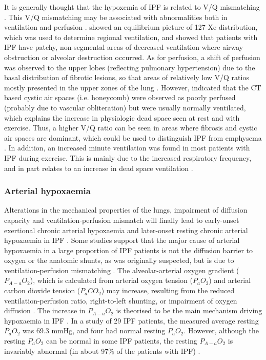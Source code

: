 It is generally thought that the hypoxemia of IPF is related to V/Q mismatching \citep{wagner1976distribution,crystal1976idiopathic,american2000idiopathic}. This V/Q mismatching may be associated with abnormalities both in ventilation and perfusion \citep{crystal1976idiopathic,strickland1993cause}. \cite{crystal1976idiopathic} showed an equilibrium picture of 127 Xe distribution, which was used to determine regional ventilation, and showed that patients with IPF have patchy, non-segmental areas of decreased ventilation where airway obstruction or alveolar destruction occurred. As for perfusion, a shift of perfusion was observed to the upper lobes (reflecting pulmonary hypertension) due to the basal distribution of fibrotic lesions, so that areas of relatively low V/Q ratios mostly presented in the upper zones of the lung \citep{crystal1976idiopathic}. However, \cite{strickland1993cause} indicated that the CT based cystic air spaces (i.e. honeycomb) were observed as poorly perfused (probably due to vascular obliteration) but were usually  normally ventilated, which explains the increase in physiologic dead space seen at rest and with exercise. Thus, a higher V/Q ratio can be seen in areas where fibrosis and cystic air spaces are dominant, which could be used to distinguish IPF from emphysema \citep{strickland1993cause}. In addition, an increased minute ventilation was found in most patients with IPF during exercise. This is mainly due to the increased respiratory frequency, and in part relates to an increase in dead space ventilation \citep{american2000idiopathic}.

\subsubsection{Arterial hypoxaemia}
Alterations in the mechanical properties of the lungs, impairment of diffusion capacity and ventilation-perfusion mismatch will finally lead to early-onset exertional chronic arterial hypoxaemia and later-onset resting chronic arterial hypoxaemia in IPF \citep{hempleman1991estimating, hughes1991dlco, plantier2018physiology}. Some studies support that the major cause of arterial hypoxaemia in a large proportion of IPF patients is not the diffusion barrier to oxygen or the anatomic shunts, as was originally suspected, but is due to ventilation-perfusion mismatching \citep{ finley1962cause, wagner1976distribution, american2000idiopathic}. The alveolar-arterial oxygen gradient ($P_{A-a}O_2$), which is calculated from arterial oxygen tension ($P_{a}O_2$) and arterial carbon dioxide tension ($P_{a}CO_2$) may increase, resulting from the reduced ventilation-perfusion ratio, right-to-left shunting, or impairment of oxygen diffusion \citep{plantier2018physiology}. The increase in $P_{A-a}O_2$ is theorised to be the main mechanism driving hypoxaemia in IPF \citep{agusti1991mechanisms}. In a study of 29 IPF patients, the measured average resting $P_a O_2$ was 69.3 mmHg, and four had normal resting $P_{a}O_2$. However, although the resting $P_{a}O_2$ can be normal in some IPF patients, the resting $P_{A-a}O_2$ is invariably abnormal (in about 97\% of the patients with IPF) \citep{crystal1976idiopathic}.

